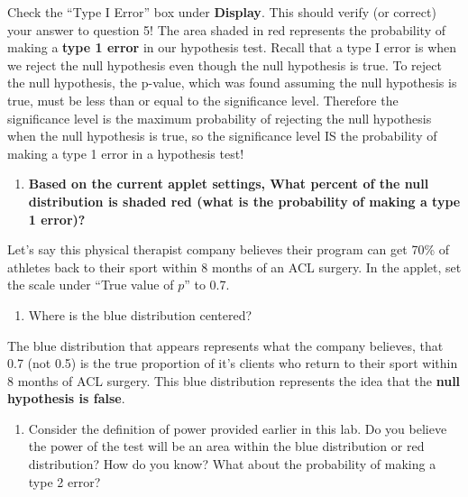 \documentclass[
]{report}
\providecommand{\tightlist}{%
  \setlength{\itemsep}{0pt}\setlength{\parskip}{0pt}}
\begin{document}
Check the ``Type I Error'' box under \textbf{Display}. This should verify (or correct) your answer to question 5! The area shaded in red represents the probability of making a \textbf{type 1 error} in our hypothesis test. Recall that a type I error is when we reject the null hypothesis even though the null hypothesis is true. To reject the null hypothesis, the p-value, which was found assuming the null hypothesis is true, must be less than or equal to the significance level. Therefore the significance level is the maximum probability of rejecting the null hypothesis when the null hypothesis is true, so the significance level IS the probability of making a type 1 error in a hypothesis test!

\begin{enumerate}
\def\labelenumi{\arabic{enumi}.}
\setcounter{enumi}{5}
\tightlist
\item
  \textbf{Based on the current applet settings, What percent of the null distribution is shaded red (what is the probability of making a type 1 error)?}
  \vspace{0.25in}
\end{enumerate}

Let's say this physical therapist company believes their program can get 70\% of athletes back to their sport within 8 months of an ACL surgery. In the applet, set the scale under ``True value of \(p\)'' to 0.7.

\begin{enumerate}
\def\labelenumi{\arabic{enumi}.}
\setcounter{enumi}{6}
\tightlist
\item
  Where is the blue distribution centered?
  \vspace{0.25in}
\end{enumerate}

The blue distribution that appears represents what the company believes, that 0.7 (not 0.5) is the true proportion of it's clients who return to their sport within 8 months of ACL surgery. This blue distribution represents the idea that the \textbf{null hypothesis is false}.

\begin{enumerate}
\def\labelenumi{\arabic{enumi}.}
\setcounter{enumi}{7}
\tightlist
\item
  Consider the definition of power provided earlier in this lab. Do you believe the power of the test will be an area within the blue distribution or red distribution? How do you know? What about the probability of making a type 2 error?
  \vspace{1in}
\end{enumerate}
\end{document}
